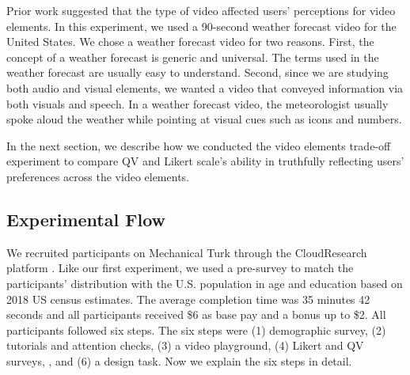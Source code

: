 Prior work suggested that the type of video affected users' perceptions for video elements. In this experiment, we used a 90-second weather forecast video for the United States. We chose a weather forecast video for two reasons. First, the concept of a weather forecast is generic and universal. The terms used in the weather forecast are usually easy to understand. Second, since we are studying both audio and visual elements, we wanted a video that conveyed information via both visuals and speech. In a weather forecast video, the meteorologist usually spoke aloud the weather while pointing at visual cues such as icons and numbers.

In the next section, we describe how we conducted the video elements trade-off experiment to compare QV and Likert scale's ability in truthfully reflecting users' preferences across the video elements.



\subsection{Experimental Flow}
We recruited participants on Mechanical Turk through the CloudResearch platform \cite{litman2017turkprime}. Like our first experiment, we used a pre-survey to match the participants' distribution with the U.S. population in age and education based on 2018 US census estimates. The average completion time was 35 minutes 42 seconds and all participants received \$6 as base pay and a bonus up to \$2. All participants followed six steps. The six steps were (1) demographic survey, (2) tutorials and attention checks, (3) a video playground, (4) Likert and QV surveys, , and (6) a design task. Now we explain the six steps in detail. 


